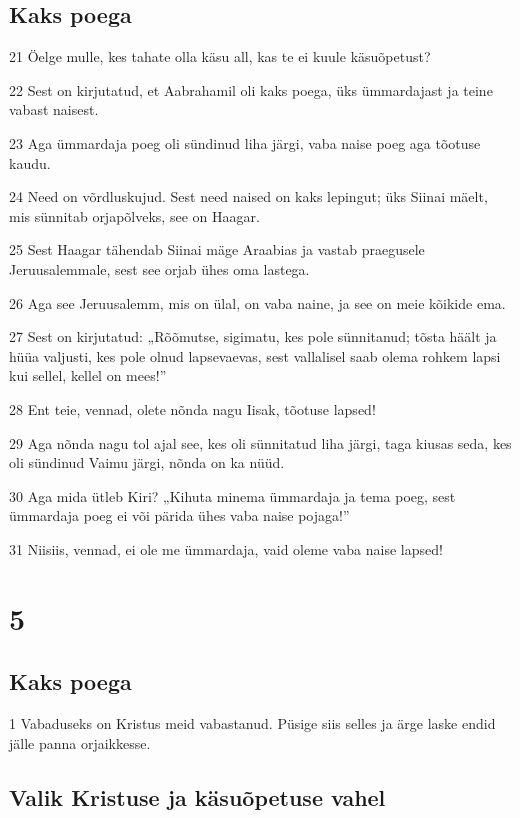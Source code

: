 \section*{Kaks poega}

\par 21 Öelge mulle, kes tahate olla käsu all, kas te ei kuule käsuõpetust?
\par 22 Sest on kirjutatud, et Aabrahamil oli kaks poega, üks ümmardajast ja teine vabast naisest.
\par 23 Aga ümmardaja poeg oli sündinud liha järgi, vaba naise poeg aga tõotuse kaudu.
\par 24 Need on võrdluskujud. Sest need naised on kaks lepingut; üks Siinai mäelt, mis sünnitab orjapõlveks, see on Haagar.
\par 25 Sest Haagar tähendab Siinai mäge Araabias ja vastab praegusele Jeruusalemmale, sest see orjab ühes oma lastega.
\par 26 Aga see Jeruusalemm, mis on ülal, on vaba naine, ja see on meie kõikide ema.
\par 27 Sest on kirjutatud: „Rõõmutse, sigimatu, kes pole sünnitanud; tõsta häält ja hüüa valjusti, kes pole olnud lapsevaevas, sest vallalisel saab olema rohkem lapsi kui sellel, kellel on mees!”
\par 28 Ent teie, vennad, olete nõnda nagu Iisak, tõotuse lapsed!
\par 29 Aga nõnda nagu tol ajal see, kes oli sünnitatud liha järgi, taga kiusas seda, kes oli sündinud Vaimu järgi, nõnda on ka nüüd.
\par 30 Aga mida ütleb Kiri? „Kihuta minema ümmardaja ja tema poeg, sest ümmardaja poeg ei või pärida ühes vaba naise pojaga!”
\par 31 Niisiis, vennad, ei ole me ümmardaja, vaid oleme vaba naise lapsed!


\chapter{5}

\section*{Kaks poega}

\par 1 Vabaduseks on Kristus meid vabastanud. Püsige siis selles ja ärge laske endid jälle panna orjaikkesse.

\section*{Valik Kristuse ja käsuõpetuse vahel}

